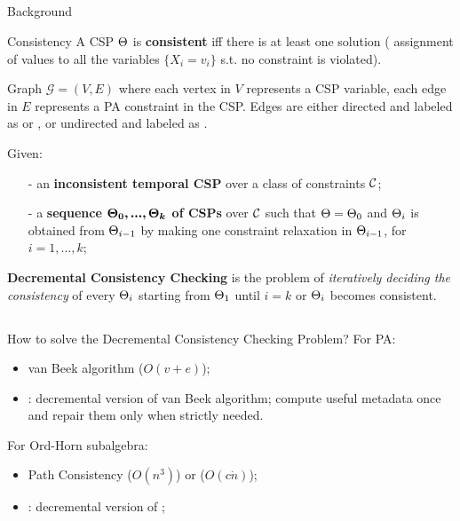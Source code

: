\documentclass[utf8, a4paper]{beamer}
\begin{document}
\subsection{}
\begin{frame}{Background}
	\begin{block}{Consistency}
		A CSP $\csp{}$ is \textbf{consistent} iff there is at least one solution (\ie{} assignment of values to all the variables $\{X_i = v_i\}$ s.t. no constraint is violated).
	\end{block}
	
	\begin{block}{\tlGraph{}}
		Graph $\mathcal{G} = (V, E)$ where each vertex in $V$ represents a CSP variable, each edge in $E$ represents a PA constraint in the CSP. Edges are either directed and labeled as \sQuote{$\leq$} or \sQuote{$<$}, or undirected and labeled as \sQuote{$\not =$}.
	\end{block}
	
	Given:
	\begin{itemize}
		\item[-] \small{an \textbf{inconsistent temporal CSP} \csp{} over a class of constraints
$\cal C$};
		\item[-] \small{a \textbf{sequence $\bm{\csp{}_{0}, ..., \csp{}_k}$ of CSPs} over $\cal C$ such that $\csp{}= \csp{}_{0}$ and $\csp{}_i$ is obtained from $\csp{}_{i-1}$ by making one constraint relaxation in $\csp{}_{i-1}$, for $i = 1, ..., k$};
	\end{itemize}
	\textbf{\color{blue} Decremental Consistency Checking} is the problem of \textit{iteratively deciding the consistency} of every $\csp{}_i$ starting from $\csp{}_1$ until $i = k$ or $\csp{}_i$ becomes consistent.
\end{frame}

\subsection{}
\begin{frame}{How to solve the Decremental Consistency Checking Problem?}
	For PA:
	\begin{itemize}
		\item van Beek algorithm ($O(v+e)$);
		\item \dpasat{}: decremental version of van Beek algorithm; compute useful metadata once and repair them only when strictly needed.
	\end{itemize}
	For Ord-Horn subalgebra:
	\begin{itemize}
		\item Path Consistency ($O(n^3)$) or \OHSAT{} ($O(c \dot n)$);
		\item \DOHSAT{}: decremental version of \OHSAT{};
	\end{itemize}
\end{frame}
\end{document}
